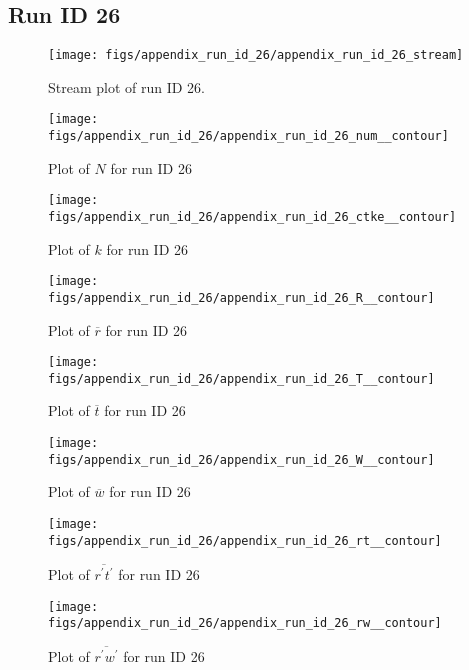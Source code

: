 \subsection{Run ID 26}
\begin{figure}[H]
\centering
\texttt{[image: figs/appendix\_run\_id\_26/appendix\_run\_id\_26\_stream]}
\caption{Stream plot of run ID 26.}
\label{fig:appendix_run_id_26_stream}
\end{figure}


\begin{figure}[H]
\centering
\texttt{[image: figs/appendix\_run\_id\_26/appendix\_run\_id\_26\_num\_\_contour]}
\caption{Plot of $N$ for run ID 26}
\label{fig:appendix_run_id_26_num__contour}
\end{figure}


\begin{figure}[H]
\centering
\texttt{[image: figs/appendix\_run\_id\_26/appendix\_run\_id\_26\_ctke\_\_contour]}
\caption{Plot of $k$ for run ID 26}
\label{fig:appendix_run_id_26_ctke__contour}
\end{figure}


\begin{figure}[H]
\centering
\texttt{[image: figs/appendix\_run\_id\_26/appendix\_run\_id\_26\_R\_\_contour]}
\caption{Plot of $\overline{r}$ for run ID 26}
\label{fig:appendix_run_id_26_R__contour}
\end{figure}


\begin{figure}[H]
\centering
\texttt{[image: figs/appendix\_run\_id\_26/appendix\_run\_id\_26\_T\_\_contour]}
\caption{Plot of $\overline{t}$ for run ID 26}
\label{fig:appendix_run_id_26_T__contour}
\end{figure}


\begin{figure}[H]
\centering
\texttt{[image: figs/appendix\_run\_id\_26/appendix\_run\_id\_26\_W\_\_contour]}
\caption{Plot of $\overline{w}$ for run ID 26}
\label{fig:appendix_run_id_26_W__contour}
\end{figure}


\begin{figure}[H]
\centering
\texttt{[image: figs/appendix\_run\_id\_26/appendix\_run\_id\_26\_rt\_\_contour]}
\caption{Plot of $\overline{r^\prime t^\prime}$ for run ID 26}
\label{fig:appendix_run_id_26_rt__contour}
\end{figure}


\begin{figure}[H]
\centering
\texttt{[image: figs/appendix\_run\_id\_26/appendix\_run\_id\_26\_rw\_\_contour]}
\caption{Plot of $\overline{r^\prime w^\prime}$ for run ID 26}
\label{fig:appendix_run_id_26_rw__contour}
\end{figure}


